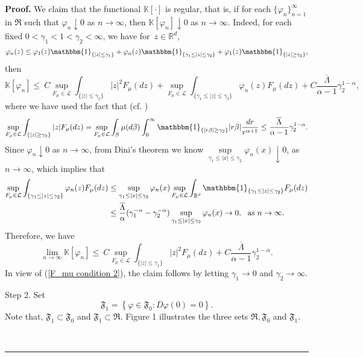 \documentclass[a4paper,oneside,10pt]{article}%
\newenvironment{proof}[1][Proof]{\noindent \textbf{#1.} }{\  \rule{0.5em}{0.5em}}
\numberwithin{equation}{section}
\begin{document}
\begin{proof}
We claim that the functional $\mathbb{K}[\cdot]$ is regular, that is, if for
each $\{ \varphi_{n}\}_{n=1}^{\infty}$ in $\mathfrak{R}$ such that
$\varphi_{n}\downarrow0$ as $n\rightarrow \infty$, then $\mathbb{K}[\varphi
_{n}]\downarrow0$ as $n\rightarrow \infty$. Indeed, for each fixed
$0<\gamma_{1}<1<\gamma_{2}<\infty$, we have for\ $z\in \mathbb{R}^{d}$,
\[
\varphi_{n}(z)\leq \varphi_{1}(z)\mathbbm{1}_{\{|z|\leq \gamma_{1}\}}%
+\varphi_{n}(z)\mathbbm{1}_{\{ \gamma_{1}\leq|z|\leq \gamma_{2}\}}+\varphi
_{1}(z)\mathbbm{1}_{\{|z|\geq \gamma_{2}\}},
\]
then
\[
\mathbb{K}[\varphi_{n}]\leq \ C\sup \limits_{F_{\mu}\in \mathcal{L}}%
\int_{\{|z|\leq \gamma_{1}\}}|z|^{2}F_{\mu}(dz)+\sup \limits_{F_{\mu}%
\in \mathcal{L}}\int_{\{ \gamma_{1}\leq|z|\leq \gamma_{2}\}}\varphi_{n}%
(z)F_{\mu}(dz)+C\frac{\overline{\Lambda}}{\alpha-1}\gamma_{2}^{1-\alpha},
\]
where we have used the fact that (cf. \cite[Remark 14.4]{Sato1999})%
\[
\sup \limits_{F_{\mu}\in \mathcal{L}}\int_{\{|z|\geq \gamma_{2}\}}|z|F_{\mu
}(dz)=\sup \limits_{F_{\mu}\in \mathcal{L}}\int_{S}\mu(d\beta)\int_{0}^{\infty
}\mathbbm{1}_{\{|r\beta|\geq \gamma_{2}\}}|r\beta|\frac{dr}{r^{\alpha+1}}%
\leq \frac{\overline{\Lambda}}{\alpha-1}\gamma_{2}^{1-\alpha}.
\]
Since $\varphi_{n}\downarrow0$ as $n\rightarrow \infty$, from Dini's theorem we
know $\sup \limits_{\gamma_{1}\leq|x|\leq \gamma_{2}}\varphi_{n}(x)\downarrow0$,
as $n\rightarrow \infty$, which implies that
\begin{align*}
\sup \limits_{F_{\mu}\in \mathcal{L}}\int_{\{ \gamma_{1}\leq|z|\leq \gamma_{2}%
\}}\varphi_{n}(z)F_{\mu}(dz)  &  \leq \sup_{\gamma_{1}\leq|x|\leq \gamma_{2}%
}\varphi_{n}(x)\sup \limits_{F_{\mu}\in \mathcal{L}}\int_{\mathbb{R}^{d}%
}\mathbbm{1}_{\{ \gamma_{1}\leq|z|\leq \gamma_{2}\}}F_{\mu}(dz)\\
&  \leq \frac{\overline{\Lambda}}{\alpha}(\gamma_{1}^{-\alpha}-\gamma
_{2}^{-\alpha})\sup_{\gamma_{1}\leq|x|\leq \gamma_{2}}\varphi_{n}%
(x)\rightarrow0,\text{ \ as }n\rightarrow \infty.
\end{align*}
Therefore, we have
\[
\lim_{n\rightarrow \infty}\mathbb{K}[\varphi_{n}]\leq \ C\sup \limits_{F_{\mu}%
\in \mathcal{L}}\int_{\{|z|\leq \gamma_{1}\}}|z|^{2}F_{\mu}(dz)+C\frac
{\overline{\Lambda}}{\alpha-1}\gamma_{2}^{1-\alpha}.
\]
In view of (\ref{F_mu condition 2}), the claim follows by letting $\gamma
_{1}\rightarrow0$ and $\gamma_{2}\rightarrow \infty$.

Step 2. Set
\[
\mathfrak{F}_{1}\mathfrak{=}\left \{  \varphi \in \mathfrak{F}_{0}:D\varphi
(0)=0\right \}  .
\]
Note that, $\mathfrak{F}_{1}\subset \mathfrak{F}_{0}$ and $\mathfrak{F}
_{1}\subset \mathfrak{R}$. Figure 1 illustrates the three sets $\mathfrak{R}%
,\mathfrak{F}_{0}$ and $\mathfrak{F}_{1}$.


\end{proof}
\end{document}
